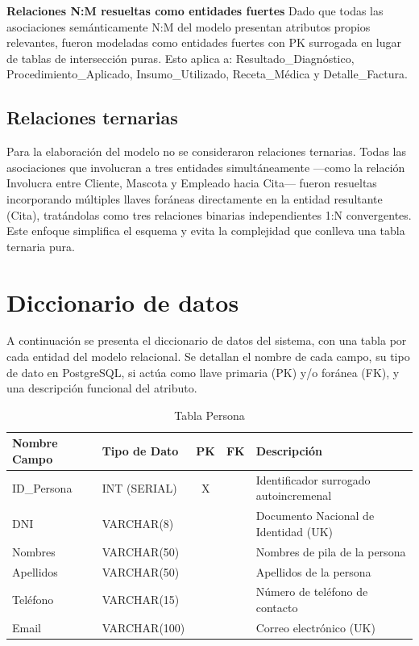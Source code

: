 \textbf{Relaciones N:M resueltas como entidades fuertes} Dado que todas las asociaciones semánticamente N:M del modelo presentan atributos propios relevantes, fueron modeladas como entidades fuertes con PK surrogada en lugar de tablas de intersección puras. Esto aplica a: Resultado\_Diagnóstico, Procedimiento\_Aplicado, Insumo\_Utilizado, Receta\_Médica y Detalle\_Factura.

\subsection{Relaciones ternarias}

Para la elaboración del modelo no se consideraron relaciones ternarias. Todas las asociaciones que involucran a tres entidades simultáneamente —como la relación Involucra entre Cliente, Mascota y Empleado hacia Cita— fueron resueltas incorporando múltiples llaves foráneas directamente en la entidad resultante (Cita), tratándolas como tres relaciones binarias independientes 1:N convergentes. Este enfoque simplifica el esquema y evita la complejidad que conlleva una tabla ternaria pura.

\section{Diccionario de datos}

A continuación se presenta el diccionario de datos del sistema, con una tabla por cada entidad del modelo relacional. Se detallan el nombre de cada campo, su tipo de dato en PostgreSQL, si actúa como llave primaria (PK) y/o foránea (FK), y una descripción funcional del atributo.

\begin{table}[H]
\centering
\footnotesize
\begin{tabular}{|l|l|c|c|p{5cm}|}
\hline
\textbf{Nombre Campo} & \textbf{Tipo de Dato} & \textbf{PK} & \textbf{FK} & \textbf{Descripción} \\
\hline
ID\_Persona & INT (SERIAL) & X & & Identificador surrogado autoincremenal \\
\hline
DNI & VARCHAR(8) & & & Documento Nacional de Identidad (UK) \\
\hline
Nombres & VARCHAR(50) & & & Nombres de pila de la persona \\
\hline
Apellidos & VARCHAR(50) & & & Apellidos de la persona \\
\hline
Teléfono & VARCHAR(15) & & & Número de teléfono de contacto \\
\hline
Email & VARCHAR(100) & & & Correo electrónico (UK) \\
\hline
\end{tabular}
\caption{Tabla Persona}
\end{table}

